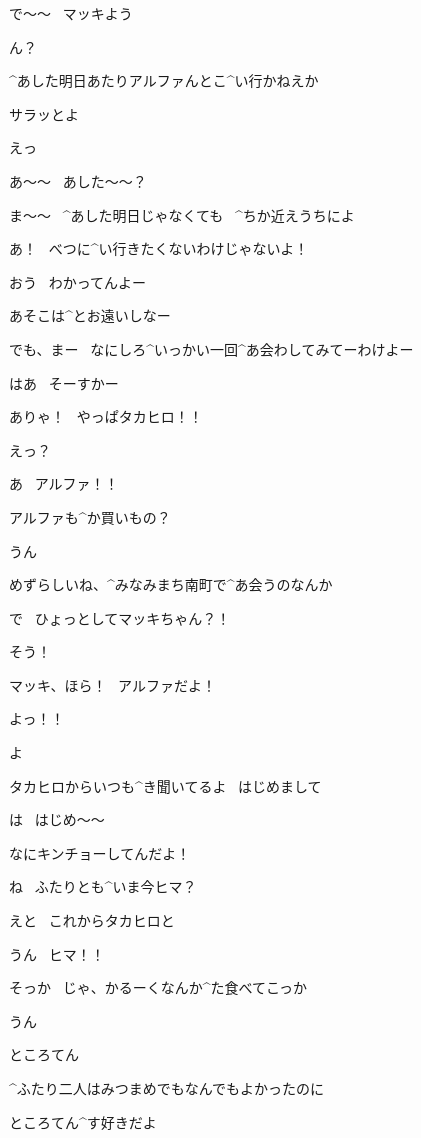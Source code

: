 \Takahiro で〜〜
\ マッキよう

\Makki ん？

\Takahiro ^{あした}{明日}あたりアルファんとこ^{い}{行}かねえか

\Takahiro サラッとよ

\Makki えっ

\Makki あ〜〜
\ あした〜〜？

\page
\Takahiro ま〜〜
\ ^{あした}{明日}じゃなくても
\ ^{ちか}{近}えうちによ

\Makki あ！
\ べつに^{い}{行}きたくないわけじゃないよ！

\Takahiro おう
\ わかってんよー

\Takahiro あそこは^{とお}{遠}いしなー

\page
\Takahiro でも、まー
\ なにしろ^{いっかい}{一回}^{あ}{会}わしてみてーわけよー

\Makki はあ
\ そーすかー

\page
\Alpha ありゃ！
\ やっぱタカヒロ！！

\Takahiro えっ？

\Takahiro あ
\ アルファ！！

\page
\Takahiro アルファも^{か}{買}いもの？

\Alpha うん

\Alpha めずらしいね、^{みなみまち}{南町}で^{あ}{会}うのなんか

\Alpha で
\ ひょっとしてマッキちゃん？！

\Takahiro そう！

\Takahiro マッキ、ほら！
\ アルファだよ！

\page
\Makki よっ！！

\Alpha よ

\page
\Alpha タカヒロからいつも^{き}{聞}いてるよ
\ はじめまして

\Makki は
\ はじめ〜〜

\Takahiro なにキンチョーしてんだよ！

\Alpha ね
\ ふたりとも^{いま}{今}ヒマ？

\Makki えと
\ これからタカヒロと

\Takahiro うん
\ ヒマ！！

\Alpha そっか
\ じゃ、かるーくなんか^{た}{食}べてこっか

\Takahiro うん

\page
\Sign ところてん

\Alpha ^{ふたり}{二人}はみつまめでもなんでもよかったのに

\Takahiro ところてん^{す}{好}きだよ

